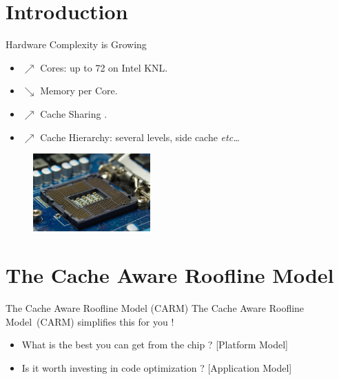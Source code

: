 \section{Introduction}
               
\begin{nframe}{Hardware Complexity is Growing}
    \begin{itemize}    
    \item $\nearrow$ Cores: up to 72 on Intel KNL.
    \item $\searrow$ Memory per Core.
    \item $\nearrow$ Cache Sharing .
    \item $\nearrow$ Cache Hierarchy: several levels, side cache \emph{etc\dots}
    \end{itemize}

    \begin{figure}
      \centering
      \includegraphics[height=3cm]{pictures/chip.jpg}
    \end{figure}
\end{nframe}


\section{The Cache Aware Roofline Model}

\begin{nframe}{The Cache Aware Roofline Model (CARM)}
  The Cache Aware Roofline Model~(CARM) simplifies this for you !
  
  \vspace{.5cm}
  \begin{itemize}
  \item \Large{What is the best you can get from the chip ? [Platform Model]}
    \vspace{.5cm}  
  \item \Large{Is it worth investing in code optimization ? [Application Model]}
  \end{itemize}
\end{nframe}

